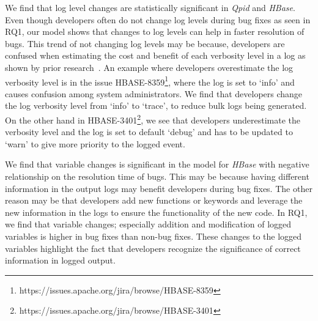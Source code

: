 We find that log level changes are statistically significant in \emph{Qpid} and \emph{HBase}. Even though developers often do not change log levels during bug fixes as seen in RQ1, our model shows that changes to log levels can help in faster resolution of bugs. This trend of not changing log levels may be because, developers are confused when estimating the cost and benefit of each verbosity level in a log as shown by prior research~\cite{Characterizinglogs}. An example where developers overestimate the log verbosity level is in the issue HBASE-8359\footnote{https://issues.apache.org/jira/browse/HBASE-8359}, where the log is set to `info' and causes confusion among system administrators. We find that developers change the log verbosity level from `info' to `trace', to reduce bulk logs being generated.  On the other hand in HBASE-3401\footnote{https://issues.apache.org/jira/browse/HBASE-3401}, we see that developers underestimate the verbosity level and the log is set to default `debug' and has to be updated to `warn' to give more priority to the logged event. 


We find that variable changes is significant in the model for \emph{HBase} with negative relationship on the resolution time of bugs. This may be because having different information in the output logs may benefit developers during bug fixes. The other reason may be that developers add new functions or keywords and leverage the new information in the logs to ensure the functionality of the new code. In RQ1, we find that variable changes; especially addition and modification of logged variables is higher in bug fixes than non-bug fixes. These changes to the logged variables highlight the fact that developers recognize the significance of correct information in logged output. 


%	

